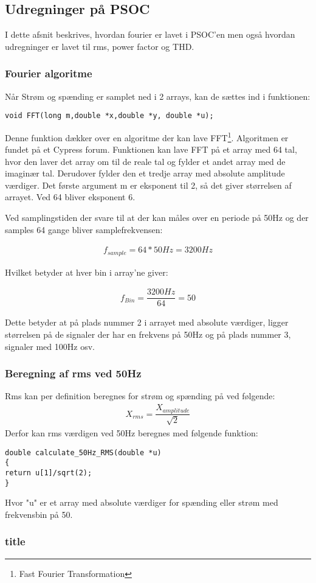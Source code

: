 
\subsection{Udregninger på PSOC}
I dette afsnit beskrives, hvordan fourier er lavet i PSOC'en men også hvordan udregninger er lavet til rms, power factor og THD.

\subsubsection{Fourier algoritme}
Når Strøm og spænding er samplet ned i 2 arrays, kan de sættes ind i funktionen:

\begin{lstlisting}
void FFT(long m,double *x,double *y, double *u);
\end{lstlisting}

Denne funktion dækker over en algoritme der kan lave FFT\footnote{Fast Fourier Transformation}. Algoritmen er fundet på et Cypress forum\cite{FFTalgo}. Funktionen kan lave FFT på et array med 64 tal, hvor den laver det array om til de reale tal og fylder et andet array med de imaginær tal. Derudover fylder den et tredje array med absolute amplitude værdiger. Det første argument m er eksponent til 2, så det giver størrelsen af arrayet. Ved 64 bliver eksponent 6.


Ved samplingstiden der svare til at der kan måles over en periode på 50Hz og der samples 64 gange bliver samplefrekvensen:

\begin{align}
f_{sample} = 64 * 50Hz = 3200Hz
\end{align}   

Hvilket betyder at hver bin i array'ne giver:

\begin{align}
f_{Bin} = \dfrac{3200Hz}{64} = 50
\end{align}

Dette betyder at på plads nummer 2 i arrayet med absolute værdiger, ligger størrelsen på de signaler der har en frekvens på 50Hz og på plads nummer 3, signaler med 100Hz osv.

\subsubsection{Beregning af rms ved 50Hz}
Rms kan per definition beregnes for strøm og spænding på ved følgende: 
\begin{align}
 X_{rms}= \dfrac{X_{amplitude}}{\sqrt{2}}
\end{align}
Derfor kan rms værdigen ved 50Hz beregnes med følgende funktion:
\begin{lstlisting}
double calculate_50Hz_RMS(double *u)
{
return u[1]/sqrt(2);  
}
\end{lstlisting}

Hvor "u" er et array med absolute værdiger for spænding eller strøm med frekvensbin på 50.

\subsubsection{title}
  
